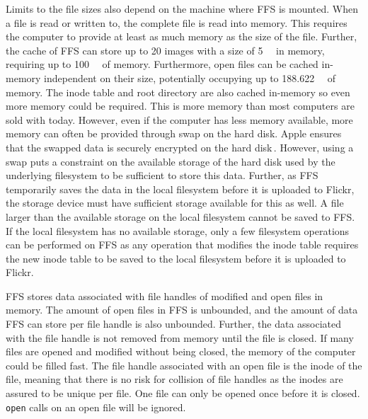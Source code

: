 Limits to the file sizes also depend on the machine where \gls{FFS} is mounted. When a file is read or written to, the complete file is read into memory. This requires the computer to provide at least as much memory as the size of the file. Further, the cache of \gls{FFS} can store up to 20 images with a size of \SI{5}{\mega\byte} in memory, requiring up to \SI{100}{\mega\byte} of memory. Furthermore, open files can be cached in-memory independent on their size, potentially occupying up to \SI{188.622}{\giga\byte} of memory. The inode table and root directory are also cached \mbox{in-memory} so even more memory could be required. This is more memory than most computers are sold with today. However, even if the computer has less memory available, more memory can often be provided through swap on the hard disk. Apple ensures that the swapped data is securely encrypted on the hard disk\,\cite{appleinc.WhatSecureVirtual}. However, using a swap puts a constraint on the available storage of the hard disk used by the underlying filesystem to be sufficient to store this data. Further, as \gls{FFS} temporarily saves the data in the local filesystem before it is uploaded to Flickr, the storage device must have sufficient storage available for this as well. A file larger than the available storage on the local filesystem cannot be saved to \gls{FFS}. If the local filesystem has no available storage, only a few filesystem operations can be performed on \gls{FFS} as any operation that modifies the inode table requires the new inode table to be saved to the local filesystem before it is uploaded to Flickr. 

\gls{FFS} stores data associated with file handles of modified and open files in memory. The amount of open files in \gls{FFS} is unbounded, and the amount of data \gls{FFS} can store per file handle is also unbounded. Further, the data associated with the file handle is not removed from memory until the file is closed. If many files are opened and modified without being closed, the memory of the computer could be filled fast. The file handle associated with an open file is the inode of the file, meaning that there is no risk for collision of file handles as the inodes are assured to be unique per file. One file can only be opened once before it is closed. \texttt{open} calls on an open file will be ignored.


